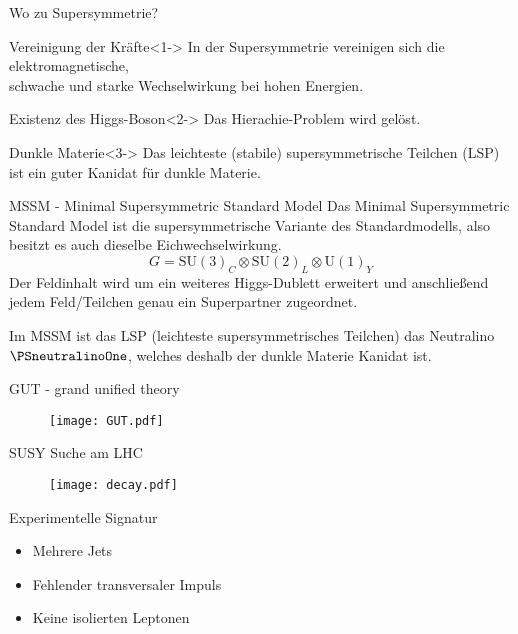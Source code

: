 \documentclass[10pt]{beamer}
\begin{document}
\begin{frame}{Wo zu Supersymmetrie?}
	\begin{block}{Vereinigung der Kräfte}<1->
	In der Supersymmetrie vereinigen sich die elektromagnetische,\\ schwache und starke Wechselwirkung bei hohen Energien.
	\end{block}
	\begin{block}{Existenz des Higgs-Boson}<2->
	Das Hierachie-Problem wird gelöst.
	\end{block} 
	\begin{block}{Dunkle Materie}<3->
	Das leichteste (stabile) supersymmetrische Teilchen (LSP) ist ein guter Kanidat für dunkle Materie.
	\end{block}
\end{frame}

\begin{frame}{MSSM - Minimal Supersymmetric Standard Model}
Das Minimal Supersymmetric Standard Model ist die supersymmetrische Variante des Standardmodells, also besitzt es auch dieselbe Eichwechselwirkung.
\begin{equation*}
G = \mathrm{SU}(3)_C\otimes \mathrm{SU}(2)_L \otimes \mathrm{U}(1)_Y
\end{equation*}
Der Feldinhalt wird um ein weiteres Higgs-Dublett erweitert und anschließend jedem Feld/Teilchen genau ein Superpartner zugeordnet.

Im MSSM ist das LSP (leichteste supersymmetrisches Teilchen) das Neutralino $\PSneutralinoOne$, welches deshalb der dunkle Materie Kanidat ist.

\end{frame}

\begin{frame}{GUT - grand unified theory}
 \begin{figure}[htp]
    	\texttt{[image: GUT.pdf]}
 \end{figure}
\end{frame}

\begin{frame}{SUSY Suche am LHC}

\begin{figure}[htp]
	\texttt{[image: decay.pdf]}
\end{figure}

\begin{block}{Experimentelle Signatur}
\begin{itemize}[<+- | alert@+>]
	\item Mehrere Jets
	\item Fehlender transversaler Impuls
	\item Keine isolierten Leptonen
\end{itemize}
\end{block}
\end{frame}
\end{document}
